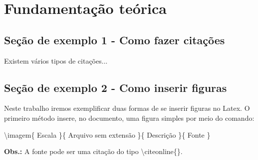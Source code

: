 \chapter{Fundamentação teórica}

\section{Seção de exemplo 1 - Como fazer citações}

Existem vários tipos de citações...


\section{Seção de exemplo 2 - Como inserir figuras}

Neste trabalho iremos exemplificar duas formas de se inserir figuras no Latex. O primeiro método insere, no documento, uma figura simples por meio do comando:

\textbackslash imagem\{ Escala \}\{ Arquivo sem extensão \}\{ Descrição \}\{ Fonte \}

\textbf{Obs.:} A fonte pode ser uma citação do tipo  \textbackslash citeonline\{\}.




